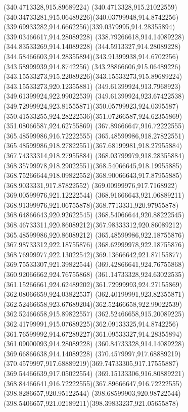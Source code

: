 {{		\lineto(340.4713328,915.89689224)
		\curveto(340.4713328,915.21022559)(340.34733281,915.06489226)(340.03799948,914.8742256)
		\curveto(339.69933282,914.6662256)(339.0379995,914.28355894)(339.03466617,914.28089228)
		\lineto(338.79266618,914.14089228)
		\lineto(344.83533269,914.14089228)
		\lineto(344.5913327,914.28089228)
		\curveto(344.58466603,914.28355894)(343.91399938,914.6702256)(343.58999939,914.8742256)
		\curveto(343.28866606,915.06489226)(343.15533273,915.22089226)(343.15533273,915.89689224)
		\lineto(343.15533273,920.12355881)
		\lineto(349.61399924,913.7968923)
		\lineto(349.61399924,922.99022539)
		\curveto(349.61399924,923.67422538)(349.72999924,923.81555871)(350.05799923,924.0395587)
		\curveto(350.41533255,924.28222536)(351.07266587,924.62355869)(351.08066587,924.62755869)
		\closepath
		\moveto(367.89666647,916.72222555)
		\lineto(365.48599986,916.72222555)
		\lineto(365.48599986,918.27822551)
		\curveto(365.48599986,918.27822551)(367.68199981,918.27955884)(367.74333314,918.27955884)
		\curveto(368.03799979,918.28355884)(368.35799978,918.29022551)(368.54066645,918.19955885)
		\curveto(368.75266644,918.09822552)(368.90066643,917.87955885)(368.9033331,917.87822552)
		\lineto(369.00999976,917.7168922)
		\lineto(369.00599976,921.12222544)
		\lineto(368.91666643,921.06889211)
		\curveto(368.91399976,921.06755878)(368.7713331,920.97955878)(368.64866643,920.92622545)
		\curveto(368.54066644,920.88222545)(368.46733311,920.86089212)(367.98333312,920.86089212)
		\lineto(365.48599986,920.86089212)
		\lineto(365.48599986,922.18755876)
		\lineto(367.98733312,922.18755876)
		\curveto(368.62999978,922.18755876)(368.76999977,922.13022542)(369.13666642,921.87155877)
		\lineto(369.75533307,921.39822544)
		\lineto(369.42866641,924.76755868)
		\lineto(360.92066662,924.76755868)
		\lineto(361.14733328,924.63022535)
		\curveto(361.15266661,924.62489202)(361.72999993,924.27155869)(362.08066659,924.03822537)
		\curveto(362.40199991,923.82355871)(362.52466658,923.67689204)(362.52466658,922.99022539)
		\lineto(362.52466658,915.89822557)
		\curveto(362.52466658,915.20089225)(362.41799991,915.07689225)(362.09133325,914.8742256)
		\curveto(361.76599992,914.67289227)(361.09533327,914.28355894)(361.09000093,914.28089228)
		\lineto(360.84733328,914.14089228)
		\lineto(369.66866638,914.14089228)
		\lineto(370.4579997,917.68889219)
		\curveto(370.4579997,917.68889219)(369.74733305,917.17555887)(369.54466639,917.05022554)
		\curveto(369.15133306,916.80889221)(368.84466641,916.72222555)(367.89666647,916.72222555)
		\moveto(398.8286657,920.95122544)
		\curveto(398.68599903,920.98722544)(398.5406657,921.02189211)(398.39833237,921.05655878)
}}
